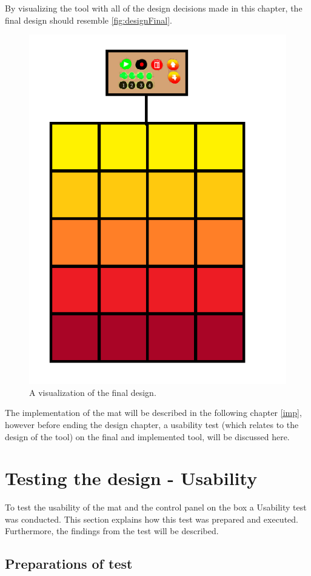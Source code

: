By visualizing the tool with all of the design decisions made in this chapter, the final design should resemble \autoref{fig:designFinal}. 
\begin{figure}[H]
	\centering
	\includegraphics[width=0.7\linewidth]{figure/Design/DesignFinal}
	\caption{A visualization of the final design.}	
	\label{fig:designFinal}
\end{figure}

The implementation of the mat will be described in the following chapter \autoref{imp}, however before ending the design chapter, a usability test (which relates to the design of the tool) on the final and implemented tool, will be discussed here. 


\section{Testing the design - Usability}
To test the usability of the mat and the control panel on the box a Usability test was conducted. This section explains how this test was prepared and executed. Furthermore, the findings from the test will be described.

\subsection{Preparations of test}

